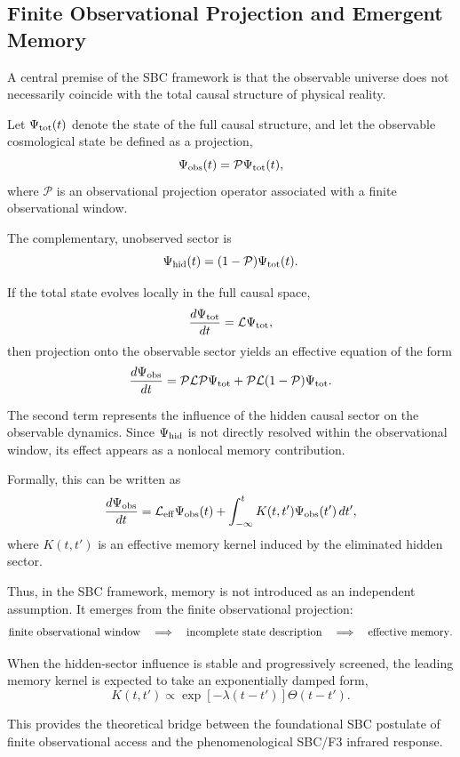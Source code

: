 \subsection{Finite Observational Projection and Emergent Memory}

A central premise of the SBC framework is that the observable universe does not necessarily coincide with the total causal structure of physical reality.

Let \(\Psi_{\rm tot}(t)\) denote the state of the full causal structure, and let the observable cosmological state be defined as a projection,
\begin{equation}
\Psi_{\rm obs}(t)
=
\mathcal{P}\Psi_{\rm tot}(t),
\end{equation}
where \(\mathcal{P}\) is an observational projection operator associated with a finite observational window.

The complementary, unobserved sector is
\begin{equation}
\Psi_{\rm hid}(t)
=
(1-\mathcal{P})\Psi_{\rm tot}(t).
\end{equation}

If the total state evolves locally in the full causal space,
\begin{equation}
\frac{d\Psi_{\rm tot}}{dt}
=
\mathcal{L}\Psi_{\rm tot},
\end{equation}
then projection onto the observable sector yields an effective equation of the form
\begin{equation}
\frac{d\Psi_{\rm obs}}{dt}
=
\mathcal{P}\mathcal{L}\mathcal{P}\Psi_{\rm tot}
+
\mathcal{P}\mathcal{L}(1-\mathcal{P})\Psi_{\rm tot}.
\end{equation}

The second term represents the influence of the hidden causal sector on the observable dynamics. Since \(\Psi_{\rm hid}\) is not directly resolved within the observational window, its effect appears as a nonlocal memory contribution.

Formally, this can be written as
\begin{equation}
\frac{d\Psi_{\rm obs}}{dt}
=
\mathcal{L}_{\rm eff}\Psi_{\rm obs}(t)
+
\int_{-\infty}^{t}
K(t,t')\Psi_{\rm obs}(t')\,dt',
\end{equation}
where \(K(t,t')\) is an effective memory kernel induced by the eliminated hidden sector.

Thus, in the SBC framework, memory is not introduced as an independent assumption. It emerges from the finite observational projection:
\begin{equation}
{\rm finite\ observational\ window}
\quad
\Longrightarrow
\quad
{\rm incomplete\ state\ description}
\quad
\Longrightarrow
\quad
{\rm effective\ memory}.
\end{equation}

When the hidden-sector influence is stable and progressively screened, the leading memory kernel is expected to take an exponentially damped form,
\begin{equation}
K(t,t')
\propto
\exp[-\lambda(t-t')]\Theta(t-t').
\end{equation}

This provides the theoretical bridge between the foundational SBC postulate of finite observational access and the phenomenological SBC/F3 infrared response.
